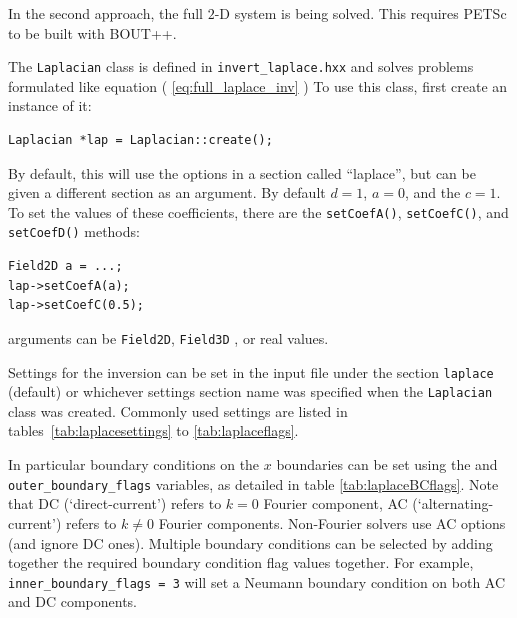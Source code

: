 \documentclass[12pt]{article}
\newcommand{\code}[1]{\texttt{#1}}
\begin{document}
In the second approach, the full $2$-D system is being solved. This requires
PETSc to be built with BOUT++.

The
%
\lstinline!Laplacian!
%
 class is defined in \texttt{invert\_laplace.hxx} and solves problems
 formulated like equation (
%
\ref{eq:full_laplace_inv}
%
)
%
To use this class, first create an instance of it:
%
\begin{lstlisting}
Laplacian *lap = Laplacian::create();
\end{lstlisting}
%
By default, this will use the options in a section called ``laplace'', but can
be given a different section as an argument.  By default $d = 1$, $a = 0$, and
the $c=1$. To set the values of these coefficients, there are the
%
\lstinline!setCoefA()!, \lstinline!setCoefC()!, and \lstinline!setCoefD()!
%
methods:
%
\begin{lstlisting}
Field2D a = ...;
lap->setCoefA(a);
lap->setCoefC(0.5);
\end{lstlisting}
%
arguments can be
%
\lstinline!Field2D!, \lstinline!Field3D!
%
, or real values.

Settings for the inversion can be set in the input file under the section
\code{laplace} (default) or whichever settings section name was specified when
the
%
\lstinline!Laplacian!
%
 class was created.  Commonly used settings are listed in
 tables~\ref{tab:laplacesettings} to \ref{tab:laplaceflags}.

In particular boundary conditions on the $x$ boundaries can be set using the
 and \code{outer\_boundary\_flags} variables, as
detailed in table \ref{tab:laplaceBCflags}.  Note that DC (`direct-current')
refers to $k = 0$ Fourier component, AC (`alternating-current') refers to $k
\neq 0$ Fourier components.  Non-Fourier solvers use AC options (and ignore DC
ones).  Multiple boundary conditions can be selected by adding together the
required boundary condition flag values together.  For example,
%
\lstinline!inner_boundary_flags = 3!
%
 will set a Neumann boundary condition on both AC and DC components.
\end{document}
